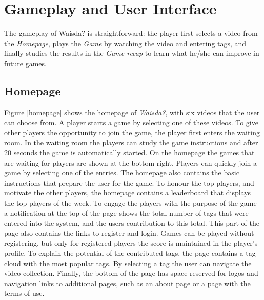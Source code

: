 \section{Gameplay and User Interface}
The gameplay of Waisda? is straightforward: the player first selects a video from the \textit{Homepage}, plays the \textit{Game} by watching the video and entering tags, and finally studies the results in the \textit{Game recap} to learn what he/she can improve in future games.

\subsection{Homepage}
Figure \ref{homepage} shows the homepage of \textit{Waisda?}, with six videos that the user can choose from. A player starts a game by selecting one of these videos. To give other players the opportunity to join the game, the player first enters the waiting room. In the waiting room the players can study the game
instructions and after 20 seconds the game is automatically started. On the homepage the games that are waiting for players are shown at the bottom right. Players can quickly join a game by selecting one of the entries.
The homepage also contains the basic instructions that prepare the user for the game. To honour the top players, and motivate the other players, the homepage contains a leaderboard that displays the top players of the week. To engage the players with the purpose of the game a notification at the top of the page shows the total number of tags that were entered into the system, and the users contribution to this total. This part of the page also contains the links to register and login. Games can be played without registering, but only for registered players the score is maintained in the player’s profile. To explain the potential of the contributed tags, the page contains a tag cloud with the most popular tags. By selecting a tag the user can navigate the video collection. Finally, the bottom of the page has space reserved for logos and navigation links to additional pages, such as an about page or a page with the terms of use.

